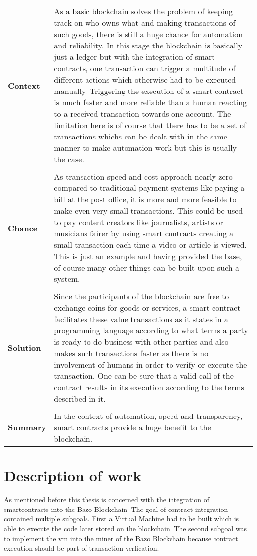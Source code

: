 \begin{tabular}[t]{ p{3cm} p{12.5cm}}
\textbf{Context} & 
As a basic blockchain solves the problem of keeping track on who owns what and making transactions of such goods, there is still a huge chance for automation and reliability. In this stage the blockchain is basically just a ledger but with the integration of smart contracts, one transaction can trigger a multitude of different actions which otherwise had to be executed manually. Triggering the execution of a smart contract is much faster and more reliable than a human reacting to a received transaction towards one account. The limitation here is of course that there has to be a set of transactions whichs can be dealt with in the same manner to make automation work but this is usually the case. \\ \\

\textbf{Chance} & 
As transaction speed and cost approach nearly zero compared to traditional payment systems like paying a bill at the post office, it is more and more feasible to make even very small transactions. This could be used to pay content creators like journalists, artists or musicians fairer by using smart contracts creating a small transaction each time a video or article is viewed. This is just an example and having provided the base, of course many other things can be built upon such a system.\\ \\

\textbf{Solution} & 
Since the participants of the blockchain are free to exchange coins for goods or services, a smart contract facilitates these value transactions as it states in a programming language according to what terms a party is ready to do business with other parties and also makes such transactions faster as there is no involvement of humans in order to verify or execute the transaction. One can be sure that a valid call of the contract results in its execution according to the terms described in it. \\ \\

\textbf{Summary} & 
In the context of automation, speed and transparency, smart contracts provide a huge benefit to the blockchain.

\end{tabular}

\section{Description of work}
As mentioned before this thesis is concerned with the integration of smartcontracts into the Bazo Blockchain. The goal of contract integration contained multiple subgoals. First a Virtual Machine had to be built which is able to execute the code later stored on the blockchain. The second subgoal was to implement the vm into the miner of the Bazo Blockchain because contract execution should be part of transaction verfication.